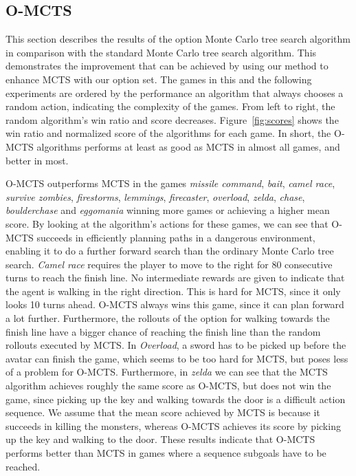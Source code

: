 \subsection{O-MCTS}
\label{subsec:omcts}
This section describes the results of the option Monte Carlo tree search
algorithm in comparison with the standard Monte Carlo tree search algorithm.
This demonstrates the improvement that can be achieved by using our method to
enhance MCTS with our option set.
The games in this and the following experiments are ordered by the performance
an algorithm that always chooses a random action, indicating the complexity of
the games.  From left to right, the random algorithm's win ratio and score
decreases. Figure~\ref{fig:scores} shows the win ratio and normalized
score of the algorithms for each game. In short, the O-MCTS algorithms performs
at least as good as MCTS in almost all games, and better in most.

O-MCTS outperforms MCTS in the games \textit{missile command}, \textit{bait},
\textit{camel race}, \textit{survive zombies}, \textit{firestorms},
\textit{lemmings}, \textit{firecaster}, \textit{overload}, \textit{zelda},
\textit{chase}, \textit{boulderchase} and \textit{eggomania} winning more games
or achieving a higher mean score. By looking at the algorithm's actions for
these games, we can see that O-MCTS succeeds in efficiently planning paths in a
dangerous environment, enabling it to do a further forward search than the
ordinary Monte Carlo tree search. 
\textit{Camel race} requires the player to
move to the right for 80 consecutive turns to reach the finish line. No
intermediate rewards are given to indicate that the agent is walking in the
right direction. This is hard for MCTS, since it only looks 10 turns ahead.
O-MCTS always wins this game, since it can plan forward a lot further.
Furthermore, the rollouts of the option for walking towards the finish line have
a bigger chance of reaching the finish line than the random rollouts executed by
MCTS\@.
In \textit{Overload}, a sword has to be picked up before the avatar can finish the
game, which seems to be too hard for MCTS, but poses less of a problem for
O-MCTS\@.  Furthermore, in \textit{zelda} we can see that the MCTS algorithm
achieves roughly the same score as O-MCTS, but does not win the game, since
picking up the key and walking towards the door is a difficult action sequence.
We assume that the mean score achieved by MCTS is because it succeeds in killing
the monsters, whereas O-MCTS achieves its score by picking up the key and
walking to the door.  These results indicate that O-MCTS performs better than
MCTS in games where a sequence subgoals have to be reached.

